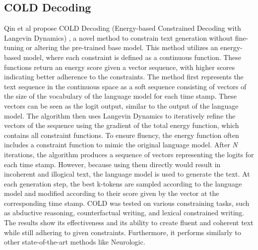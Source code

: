 \subsection{COLD Decoding}
Qin et al propose COLD Decoding (Energy-based Constrained Decoding with Langevin Dynamics) \cite{qin_cold_2022}, a novel method to constrain text generation without fine-tuning or altering the pre-trained base model. This method utilizes an energy-based model, where each constraint is defined as a continuous function. These functions return an energy score given a vector sequence, with higher scores indicating better adherence to the constraints. The method first represents the text sequence in the continuous space as a soft sequence consisting of vectors of the size of the vocabulary of the language model for each time stamp. These vectors can be seen as the logit output, similar to the output of the language model. The algorithm then uses Langevin Dynamics to iteratively refine the vectors of the sequence using the gradient of the total energy function, which contains all constraint functions. To ensure fluency, the energy function often includes a constraint function to mimic the original language model. After \textit{N} iterations, the algorithm produces a sequence of vectors representing the logits for each time stamp. However, because using them directly would result in incoherent and illogical text, the language model is used to generate the text. At each generation step, the best k-tokens are sampled according to the language model and modified according to their score given by the vector at the corresponding time stamp. COLD was tested on various constraining tasks, such as abductive reasoning, counterfactual writing, and lexical constrained writing. The results show its effectiveness and its ability to create fluent and coherent text while still adhering to given constraints. Furthermore, it performs similarly to other state-of-the-art methods like Neurologic.

